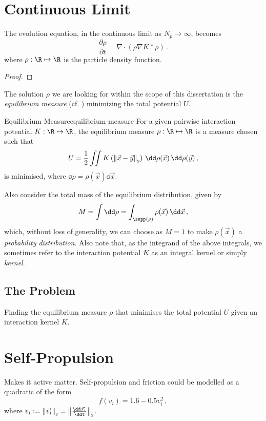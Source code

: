 \section{Continuous Limit}
The evolution equation, in the continuous limit as $N_p \rightarrow \infty$, becomes
\begin{equation}
  \frac{\partial \rho}{\partial t} = \nabla \cdot \left(\rho \nabla K * \rho\right)\,.
  \label{eq:continuous-evolution-equation}
\end{equation}
where $\rho: \R \mapsto \R$ is the particle density function.
\begin{proof}
  \hierKoennteIhreWerbungStehen
\end{proof}
The solution $\rho$ we are looking for within the scope of this dissertation is the \textit{equilibrium measure} (cf. ) minimizing the total potential $U$.

\begin{definition}{Equilibrium Measure}{equilibrium-measure}
  For a given pairwise interaction potential $K: \R \mapsto \R$, the equilibrium measure $\rho: \R \mapsto \R$ is a measure chosen such that
  $$U = \frac{1}{2} \iint K\left(\norm{\vec{x} - \vec{y}}\right) \,\dd\rho(\vec{x})\,\dd\rho(\vec{y})\,,$$
  is minimised, where $\dd\rho = \rho(\vec{x})\dd\vec{x}$.
\end{definition}
Also consider the total mass of the equilibrium distribution, given by
\begin{equation}
  M = \int \dd\rho = \int_{\supp(\rho)} \rho(\vec{x}) \,\dd\vec{x}\,,
  \label{eq:measure-mass}
\end{equation}
which, without loss of generality, we can choose as $M = 1$ to make $\rho(\vec{x})$ a \textit{probability distribution}.
Also note that, as the integrand of the above integrals, we sometimes refer to the interaction potential $K$ as an integral kernel or simply \textit{kernel}.



\subsection{The Problem}
\label{sec:the-problem}
Finding the equilibrium measure $\rho$ that minimises the total potential $U$ given an interaction kernel $K$.
\hierKoennteIhreWerbungStehen

\section{Self-Propulsion}
Makes it active matter.
Self-propulsion and friction could be modelled as a quadratic of the form
$$f(v_i) = 1.6 - 0.5 v_i^2\,,$$
where $v_i := \norm{\vec{v_i}} = \norm{\frac{\dd\vec{x_i}}{\ddt}}$.

